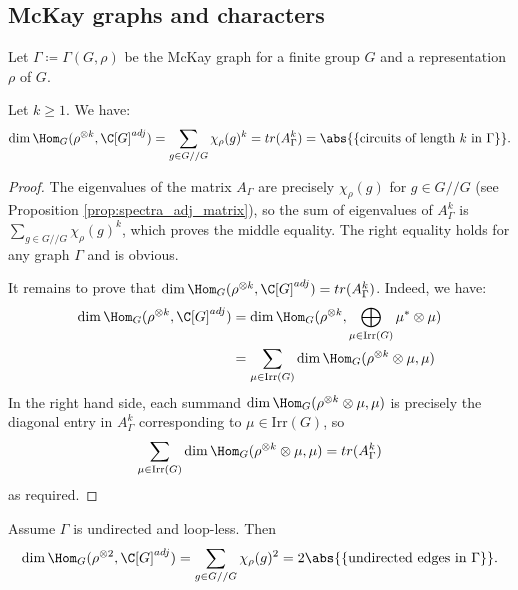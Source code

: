 \subsection{McKay graphs and characters}
Let $\Gamma \coloneqq  \Gamma(G, \rho)$ be the McKay graph for a finite group $G$ and a representation $\rho$ of $G$. 
\begin{lemma}\label{lem:trace}
 Let $k\geq 1$. We have: 
 $$
\dim \Hom_G(\rho^{\otimes k}, \C[G]^{adj}) = \sum_{g \in G//G} \chi_\rho(g)^k = tr(A^k_{\Gamma}) = \abs{\{\text{circuits of length } k \text{ in } \Gamma \}}.  $$

\end{lemma}
\begin{proof}
 The eigenvalues of the matrix $A_{\Gamma}$ are precisely $\chi_\rho(g)$ for $g \in G//G$ (see Proposition \ref{prop:spectra_adj_matrix}), so the sum of eigenvalues of $A^k_{\Gamma}$ is $\sum_{g \in G//G} \chi_\rho(g)^k $, which proves the middle equality. The right equality holds for any graph $\Gamma$ and is obvious.
 
 It remains to prove that $\dim \Hom_G(\rho^{\otimes k}, \C[G]^{adj}) = tr(A^k_{\Gamma})$. Indeed, we have:
 \begin{align*}
 \dim \Hom_G(\rho^{\otimes k}, \C[G]^{adj}) &= \dim \Hom_G(\rho^{\otimes k}, \bigoplus_{\mu \in \mathrm{Irr}(G)} \mu^* \otimes \mu) \\
 &= \sum_{\mu \in \mathrm{Irr}(G)} \dim \Hom_G(\rho^{\otimes k}\otimes \mu, \mu)
 \end{align*}
 In the right hand side, each summand $\dim \Hom_G(\rho^{\otimes k}\otimes \mu, \mu)$ is precisely the diagonal entry in $A^k_{\Gamma}$ corresponding to $\mu \in \mathrm{Irr}(G)$, so $$\sum_{\mu \in \mathrm{Irr}(G)} \dim \Hom_G(\rho^{\otimes k}\otimes \mu, \mu)= tr(A^k_{\Gamma})$$ as required.
\end{proof}

\begin{coro}\label{cor:trace}
 Assume $\Gamma$ is undirected and loop-less. Then $$\dim \Hom_G(\rho^{\otimes 2}, \C[G]^{adj}) =\sum_{g \in G//G} \chi_\rho(g)^2 = 2\abs{\{\text{undirected edges in } \Gamma\}}.$$
\end{coro}




